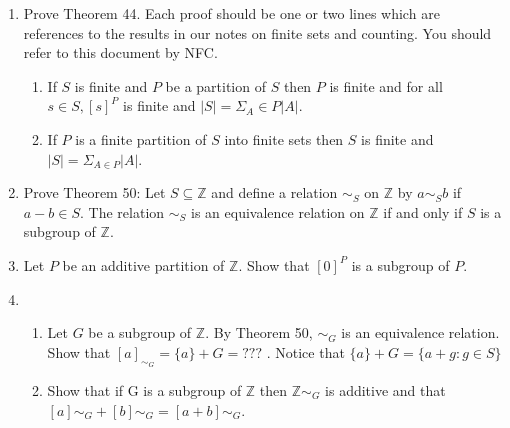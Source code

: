 \documentclass[11pt]{article}
\begin{document}
\begin{enumerate}
\newpage %
\item Prove Theorem 44. Each proof should be one or two lines which are references to the results in our notes on finite sets and counting. You should refer to this document by NFC.
\begin{enumerate}
\item If $S$ is finite and $P$ be a partition of $S$ then $P$ is finite and for all $s \in S, [s]^P$ is finite and $|S| = \Sigma_A \in P|A|$.
\\
\item If $P$ is a finite partition of $S$ into finite sets then $S$ is finite and $|S| = \Sigma_{A \in P}|A|$.
\end{enumerate}

\newpage %
\item Prove Theorem 50: Let $S \subseteq \mathbb{Z}$ and define a relation $\sim_S$ on $\mathbb{Z}$ by $a \sim_S b$ if $a-b \in S$.  The relation $\sim_S$ is an equivalence relation on $\mathbb{Z}$ if and only if $S$ is a subgroup of $\mathbb{Z}$.

\newpage %
\item Let $P$ be an additive partition of $\mathbb{Z}$. Show that $[0]^P$ is a subgroup of $P$.


\newpage %
\item
\begin{enumerate}
\item Let $G$ be a subgroup of $\mathbb{Z}$. By Theorem 50, $\sim_G$ is an equivalence relation. Show that $[a]_{\sim_G} = \{a\}+G = ???$ . Notice that $\{a\} + G = \{a + g : g \in S\}$
\\
\item Show that if G is a subgroup of $\mathbb{Z}$ then $\mathbb{Z}\sim_G$ is additive and that $[a]\sim_G + [b]\sim_G = [a + b]\sim_G$.
\end{enumerate}


\end{enumerate} %
\end{document}
